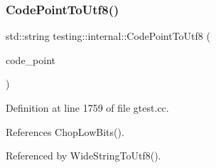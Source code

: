 \subsubsection{\texorpdfstring{Code\+Point\+To\+Utf8()}{CodePointToUtf8()}}
{\footnotesize\ttfamily std\+::string testing\+::internal\+::\+Code\+Point\+To\+Utf8 (\begin{DoxyParamCaption}\item[{\hyperlink{namespacetesting_1_1internal_a40d4fffcd2bf56f18b1c380615aa85e3}{U\+Int32}}]{code\+\_\+point }\end{DoxyParamCaption})}



Definition at line 1759 of file gtest.\+cc.



References Chop\+Low\+Bits().



Referenced by Wide\+String\+To\+Utf8().


